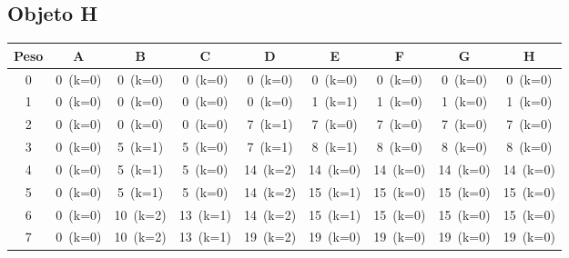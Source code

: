 \documentclass[12pt]{article}
\begin{document}
\begin{landscape}
\subsection*{Objeto H}
\begin{longtable}{ccccccccc}
\toprule
Peso & A & B & C & D & E & F & G & H \\
\midrule
0 & \cellcolor{red!20}0~(k=0) & \cellcolor{red!20}0~(k=0) & \cellcolor{red!20}0~(k=0) & \cellcolor{red!20}0~(k=0) & \cellcolor{red!20}0~(k=0) & \cellcolor{red!20}0~(k=0) & \cellcolor{red!20}0~(k=0) & \cellcolor{red!20}0~(k=0) \\
1 & \cellcolor{red!20}0~(k=0) & \cellcolor{red!20}0~(k=0) & \cellcolor{red!20}0~(k=0) & \cellcolor{red!20}0~(k=0) & \cellcolor{green!40}1~(k=1) & \cellcolor{red!20}1~(k=0) & \cellcolor{red!20}1~(k=0) & \cellcolor{red!20}1~(k=0) \\
2 & \cellcolor{red!20}0~(k=0) & \cellcolor{red!20}0~(k=0) & \cellcolor{red!20}0~(k=0) & \cellcolor{green!40}7~(k=1) & \cellcolor{red!20}7~(k=0) & \cellcolor{red!20}7~(k=0) & \cellcolor{red!20}7~(k=0) & \cellcolor{red!20}7~(k=0) \\
3 & \cellcolor{red!20}0~(k=0) & \cellcolor{green!40}5~(k=1) & \cellcolor{red!20}5~(k=0) & \cellcolor{green!40}7~(k=1) & \cellcolor{green!40}8~(k=1) & \cellcolor{red!20}8~(k=0) & \cellcolor{red!20}8~(k=0) & \cellcolor{red!20}8~(k=0) \\
4 & \cellcolor{red!20}0~(k=0) & \cellcolor{green!40}5~(k=1) & \cellcolor{red!20}5~(k=0) & \cellcolor{green!40}14~(k=2) & \cellcolor{red!20}14~(k=0) & \cellcolor{red!20}14~(k=0) & \cellcolor{red!20}14~(k=0) & \cellcolor{red!20}14~(k=0) \\
5 & \cellcolor{red!20}0~(k=0) & \cellcolor{green!40}5~(k=1) & \cellcolor{red!20}5~(k=0) & \cellcolor{green!40}14~(k=2) & \cellcolor{green!40}15~(k=1) & \cellcolor{red!20}15~(k=0) & \cellcolor{red!20}15~(k=0) & \cellcolor{red!20}15~(k=0) \\
6 & \cellcolor{red!20}0~(k=0) & \cellcolor{green!40}10~(k=2) & \cellcolor{green!40}13~(k=1) & \cellcolor{green!40}14~(k=2) & \cellcolor{green!40}15~(k=1) & \cellcolor{red!20}15~(k=0) & \cellcolor{red!20}15~(k=0) & \cellcolor{red!20}15~(k=0) \\
7 & \cellcolor{red!20}0~(k=0) & \cellcolor{green!40}10~(k=2) & \cellcolor{green!40}13~(k=1) & \cellcolor{green!40}19~(k=2) & \cellcolor{red!20}19~(k=0) & \cellcolor{red!20}19~(k=0) & \cellcolor{red!20}19~(k=0) & \cellcolor{red!20}19~(k=0) \\

\end{longtable}
\end{landscape}
\end{document}
